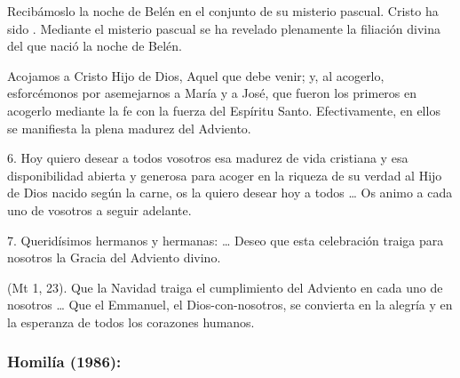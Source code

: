 \begin{body}
					Recibámoslo la noche de Belén en el conjunto de su misterio pascual.  Cristo ha sido . Mediante el misterio pascual se ha revelado plenamente la filiación divina del que nació la noche de Belén.
					
					Acojamos a Cristo Hijo de Dios, Aquel que debe venir; y, al acogerlo, esforcémonos por asemejarnos a María y a José, que fueron los primeros en acogerlo mediante la fe con la fuerza del Espíritu Santo. Efectivamente, en ellos se manifiesta la plena madurez del Adviento.
					
					6. Hoy quiero desear a todos vosotros esa madurez de vida cristiana y esa disponibilidad abierta y generosa para acoger en la riqueza de su verdad al Hijo de Dios nacido según la carne, os la quiero desear hoy a todos \ldots{} Os animo a cada uno de vosotros a seguir adelante.
					
					7. Queridísimos hermanos y hermanas:  \ldots{} Deseo que esta celebración traiga para nosotros la Gracia del Adviento divino.
					
					 (Mt 1, 23). Que la Navidad traiga el cumplimiento del Adviento en cada uno de nosotros \ldots{} Que el Emmanuel, el Dios-con-nosotros, se convierta en la alegría y en la esperanza de todos los corazones humanos.
				\end{body}

			\subsubsection{Homilía (1986):}


